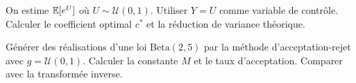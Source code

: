 \begin{exercice}
On estime $\mathbb{E}[e^U]$ o\`u $U \sim \mathcal{U}(0,1)$. Utiliser $Y = U$ comme
variable de contr\^ole. Calculer le coefficient optimal $c^*$ et la
r\'eduction de variance th\'eorique.
\end{exercice}

\begin{exercice}
G\'en\'erer des r\'ealisations d'une loi $\mathrm{Beta}(2,5)$ par la m\'ethode
d'acceptation-rejet avec $g = \mathcal{U}(0,1)$. Calculer la constante $M$ et
le taux d'acceptation. Comparer avec la transform\'ee inverse.
\end{exercice}
